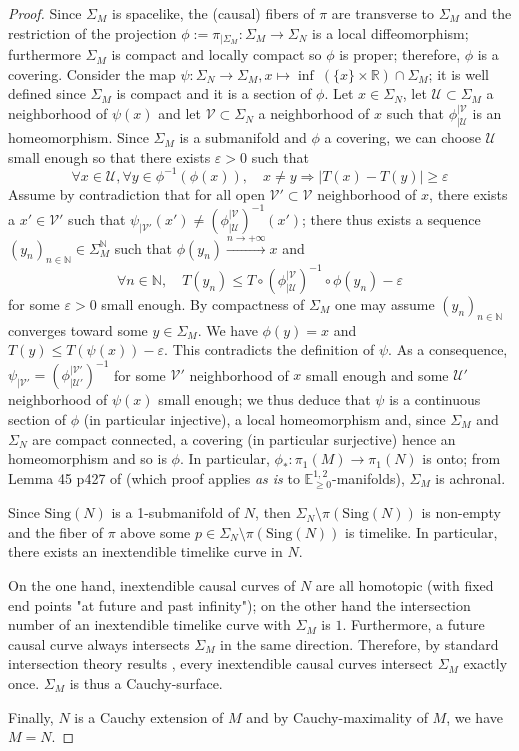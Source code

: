 \documentclass[a4paper,12pt]{article}
\def\U{\mathcal U}
\def\V{\mathcal V}
\def\N{\mathbb N}
\def\sing{\mathrm{Sing}}
\def\RR{\mathbb{R}}
\newcommand{\mass}[1]{{\mathbb E}^{1,2}_{#1}}
\begin{document}
\begin{proof}
Since $\Sigma_M$ is spacelike, the (causal) fibers of $\pi$ are transverse to $\Sigma_M$ and the restriction of the projection $\phi:=\pi_{|\Sigma_M}:\Sigma_M\rightarrow \Sigma_N$ is a local diffeomorphism; furthermore $\Sigma_M$ is compact and locally compact so $\phi$ is proper; therefore, $\phi$ is a covering. Consider the map $\psi : \Sigma_N \rightarrow \Sigma_M,x \mapsto \inf~(\{x\}\times \RR) \cap \Sigma_M$; it is well defined since $\Sigma_M$ is compact and it is a section of $\phi$. Let $x\in \Sigma_N$, let $\U\subset \Sigma_M $ a neighborhood of $\psi(x)$   and let $\V \subset \Sigma_N$ a neighborhood of $x$ such that $\phi_{|\U}^{|\V}$ is an homeomorphism. 
Since $\Sigma_M$ is a submanifold and $\phi$ a covering, we can choose $\U$ small enough so that there exists $\varepsilon>0$ such that $$\forall x\in \U, \forall y\in \phi^{-1}(\phi(x)),\quad x\neq y \Rightarrow |T(x)-T(y)|\geq \varepsilon$$
Assume by contradiction that for all open $\V'\subset \V$ neighborhood of $x$, there exists a $ x'\in \V'$ such that $\psi_{|\V'}(x') \neq (\phi_{|\U}^{|\V})^{-1}(x')$; there thus exists a sequence $(y_n)_{n\in\N} \in \Sigma_M^\N $ such that $\phi(y_n)\xrightarrow{n\rightarrow +\infty} x$ and $$\forall n\in\N,\quad  T(y_n)\leq  T\circ (\phi_{|\U}^{|\V})^{-1}\circ \phi(y_n)-\varepsilon$$ for some $\varepsilon>0$ small enough.  By compactness of $\Sigma_M$ one may assume $(y_n)_{n\in\N}$ converges toward some $y\in \Sigma_M$. We have $\phi(y) = x$ and $T(y)\leq T(\psi(x))-\varepsilon$. This contradicts the definition of $\psi$. 
As a consequence, $\psi_{|\V'} = (\phi_{|\U'}^{|\V'})^{-1}$ for some $\V'$ neighborhood of $x$ small  enough and some $\U'$ neighborhood of $\psi(x)$ small enough; we thus deduce that $\psi$ is a continuous section of $\phi$ (in particular injective), a local homeomorphism and, since $\Sigma_M$ and $\Sigma_N$ are compact connected, a covering (in particular surjective) hence an homeomorphism and so is $\phi$.  In particular, $\phi_*:\pi_1(M)\rightarrow \pi_1(N)$ is onto;
from Lemma 45 p427 of \cite{oneil} (which proof applies {\it as is} to $\mass{\geq0}$-manifolds), $\Sigma_M$ is achronal.

Since $\sing(N)$ is a 1-submanifold of $N$, then $\Sigma_N\setminus \pi(\sing(N))$ is non-empty and the fiber of $\pi$ above some $p \in \Sigma_N\setminus \pi(\sing(N))$ is timelike. In particular, there exists an inextendible timelike curve in $N$.

On the one hand, inextendible causal curves of $N$ are all homotopic (with  fixed end points "at future and past infinity"); on the other hand the intersection number of an inextendible timelike curve with $\Sigma_M$ is $1$. Furthermore, a future causal curve always intersects $\Sigma_M$ in the same direction. Therefore, 
 by standard intersection theory results \cite{MR2680546}, every inextendible causal curves intersect $\Sigma_M$ exactly once. 
$\Sigma_M$ is thus a Cauchy-surface.

Finally, $N$ is a Cauchy extension of $M$ and by Cauchy-maximality of $M$, we have $M=N$.


\end{proof}
\end{document}
